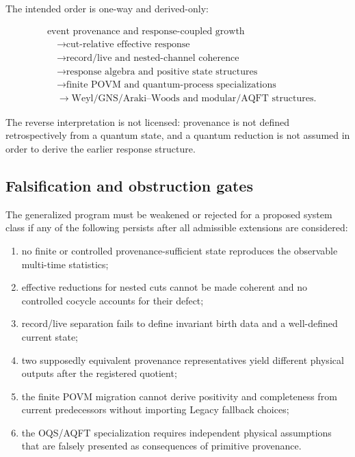 The intended order is one-way and derived-only:

\[
\begin{aligned}
&\text{event provenance and response-coupled growth}\\
&\quad\longrightarrow\text{cut-relative effective response}\\
&\quad\longrightarrow\text{record/live and nested-channel coherence}\\
&\quad\longrightarrow\text{response algebra and positive state structures}\\
&\quad\longrightarrow\text{finite POVM and quantum-process specializations}\\
&\quad\longrightarrow\text{Weyl/GNS/Araki--Woods and modular/AQFT structures}.
\end{aligned}
\]

The reverse interpretation is not licensed: provenance is not defined
retrospectively from a quantum state, and a quantum reduction is not
assumed in order to derive the earlier response structure.

\subsection{Falsification and obstruction
gates}\label{falsification-and-obstruction-gates}

The generalized program must be weakened or rejected for a proposed
system class if any of the following persists after all admissible
extensions are considered:

\begin{enumerate}
\def\labelenumi{\arabic{enumi}.}
\tightlist
\item
  no finite or controlled provenance-sufficient state reproduces the
  observable multi-time statistics;
\item
  effective reductions for nested cuts cannot be made coherent and no
  controlled cocycle accounts for their defect;
\item
  record/live separation fails to define invariant birth data and a
  well-defined current state;
\item
  two supposedly equivalent provenance representatives yield different
  physical outputs after the registered quotient;
\item
  the finite POVM migration cannot derive positivity and completeness
  from current predecessors without importing Legacy fallback choices;
\item
  the OQS/AQFT specialization requires independent physical assumptions
  that are falsely presented as consequences of primitive provenance.
\end{enumerate}


